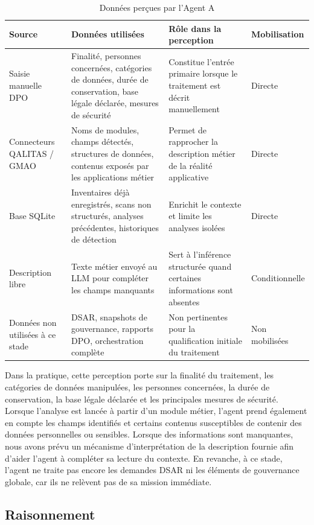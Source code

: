 \documentclass[12pt,a4paper]{report}
\begin{document}
\begin{table}[H]
\centering
\caption{Données perçues par l'Agent A}
\label{tab:perception_agent_a}
\begin{tabularx}{\textwidth}{|p{3cm}|X|X|p{2.7cm}|}
\hline
\textbf{Source} & \textbf{Données utilisées} & \textbf{Rôle dans la perception} & \textbf{Mobilisation} \\
\hline
Saisie manuelle DPO & Finalité, personnes concernées, catégories de données, durée de conservation, base légale déclarée, mesures de sécurité & Constitue l'entrée primaire lorsque le traitement est décrit manuellement & Directe \\
\hline
Connecteurs QALITAS / GMAO & Noms de modules, champs détectés, structures de données, contenus exposés par les applications métier & Permet de rapprocher la description métier de la réalité applicative & Directe \\
\hline
Base SQLite & Inventaires déjà enregistrés, scans non structurés, analyses précédentes, historiques de détection & Enrichit le contexte et limite les analyses isolées & Directe \\
\hline
Description libre & Texte métier envoyé au LLM pour compléter les champs manquants & Sert à l'inférence structurée quand certaines informations sont absentes & Conditionnelle \\
\hline
Données non utilisées à ce stade & DSAR, snapshots de gouvernance, rapports DPO, orchestration complète & Non pertinentes pour la qualification initiale du traitement & Non mobilisées \\
\hline
\end{tabularx}
\end{table}

Dans la pratique, cette perception porte sur la finalité du traitement, les catégories de données manipulées, les personnes concernées, la durée de conservation, la base légale déclarée et les principales mesures de sécurité. Lorsque l'analyse est lancée à partir d'un module métier, l'agent prend également en compte les champs identifiés et certains contenus susceptibles de contenir des données personnelles ou sensibles. Lorsque des informations sont manquantes, nous avons prévu un mécanisme d'interprétation de la description fournie afin d'aider l'agent à compléter sa lecture du contexte. En revanche, à ce stade, l'agent ne traite pas encore les demandes DSAR ni les éléments de gouvernance globale, car ils ne relèvent pas de sa mission immédiate.

\subsection{Raisonnement}
\end{document}
